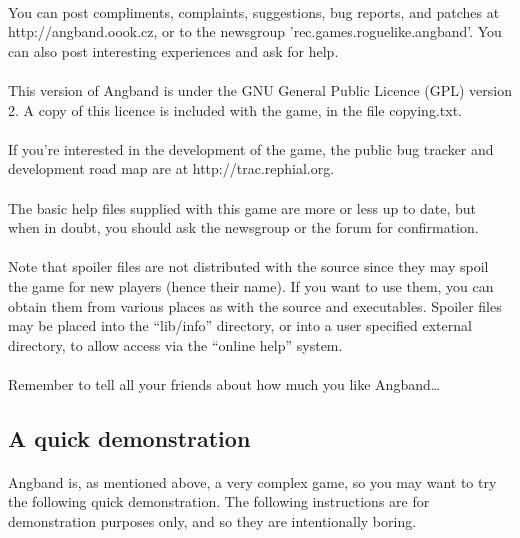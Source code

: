 \paragraph{}You can post compliments, complaints, suggestions, bug reports, and
patches at http://angband.oook.cz, or to the newsgroup
'rec.games.roguelike.angband'. You can also post interesting experiences
and ask for help.

\paragraph{}This version of Angband is under the GNU General Public Licence (GPL)
version 2. A copy of this licence is included with the game, in the file
copying.txt.

\paragraph{}If you're interested in the development of the game, the public bug
tracker and development road map are at http://trac.rephial.org.

\paragraph{}The basic help files supplied with this game are more or less up to
date, but when in doubt, you should ask the newsgroup or the forum for
confirmation.

\paragraph{}Note that spoiler files are not distributed with the source since they
may spoil the game for new players (hence their name). If you want to
use them, you can obtain them from various places as with the source and
executables. Spoiler files may be placed into the ``lib/info'' directory,
or into a user specified external directory, to allow access via the
``online help'' system.

\paragraph{}Remember to tell all your friends about how much you like
Angband\ldots

\subsection{A quick demonstration}
\paragraph{}Angband is, as mentioned above, a very complex game, so you may want to
try the following quick demonstration. The following instructions are
for demonstration purposes only, and so they are intentionally boring.

